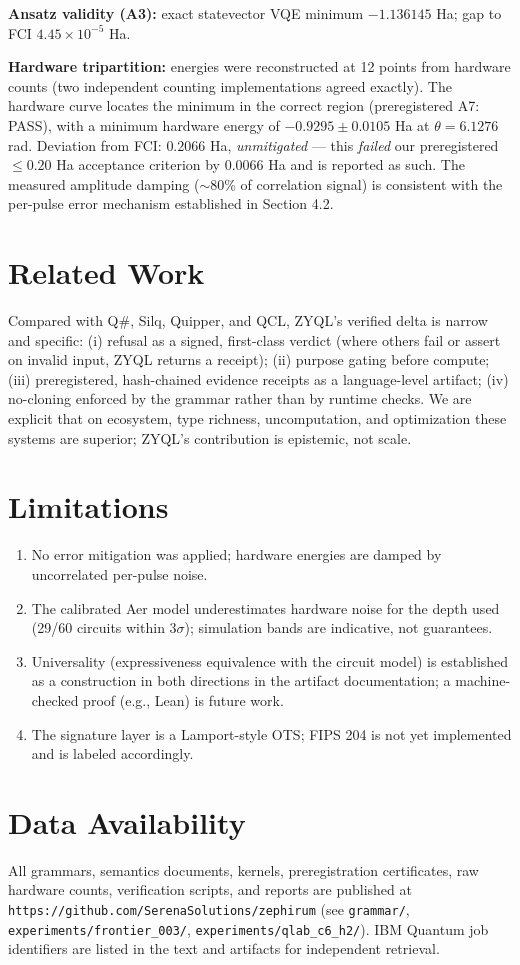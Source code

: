 \documentclass[11pt]{article}
\begin{document}
\textbf{Ansatz validity (A3):} exact statevector VQE minimum $-1.136145$ Ha; gap to FCI $4.45\times10^{-5}$ Ha.

\textbf{Hardware tripartition:} energies were reconstructed at 12 points from hardware counts (two independent counting implementations agreed exactly). The hardware curve locates the minimum in the correct region (preregistered A7: PASS), with a minimum hardware energy of $-0.9295 \pm 0.0105$ Ha at $\theta = 6.1276$ rad. Deviation from FCI: $0.2066$ Ha, \emph{unmitigated} --- this \emph{failed} our preregistered $\le 0.20$ Ha acceptance criterion by $0.0066$ Ha and is reported as such. The measured amplitude damping ($\sim$80\% of correlation signal) is consistent with the per-pulse error mechanism established in Section 4.2.

\section{Related Work}
Compared with Q\#, Silq, Quipper, and QCL, ZYQL's verified delta is narrow and specific: (i) refusal as a signed, first-class verdict (where others fail or assert on invalid input, ZYQL returns a receipt); (ii) purpose gating before compute; (iii) preregistered, hash-chained evidence receipts as a language-level artifact; (iv) no-cloning enforced by the grammar rather than by runtime checks. We are explicit that on ecosystem, type richness, uncomputation, and optimization these systems are superior; ZYQL's contribution is epistemic, not scale.

\section{Limitations}
\begin{enumerate}
\item No error mitigation was applied; hardware energies are damped by uncorrelated per-pulse noise.
\item The calibrated Aer model underestimates hardware noise for the depth used (29/60 circuits within $3\sigma$); simulation bands are indicative, not guarantees.
\item Universality (expressiveness equivalence with the circuit model) is established as a construction in both directions in the artifact documentation; a machine-checked proof (e.g., Lean) is future work.
\item The signature layer is a Lamport-style OTS; FIPS 204 is not yet implemented and is labeled accordingly.
\end{enumerate}

\section{Data Availability}
All grammars, semantics documents, kernels, preregistration certificates, raw hardware counts, verification scripts, and reports are published at \texttt{https://github.com/SerenaSolutions/zephirum} (see \texttt{grammar/}, \texttt{experiments/frontier\_003/}, \texttt{experiments/qlab\_c6\_h2/}). IBM Quantum job identifiers are listed in the text and artifacts for independent retrieval.
\end{document}
